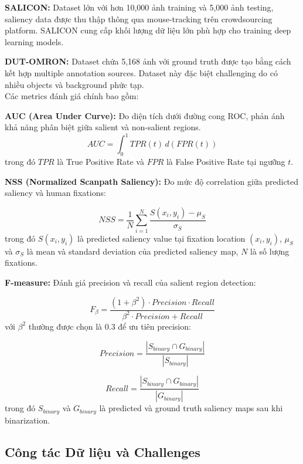 \textbf{SALICON:} Dataset lớn với hơn 10,000 ảnh training và 5,000 ảnh testing, saliency data được thu thập thông qua mouse-tracking trên crowdsourcing platform. SALICON cung cấp khối lượng dữ liệu lớn phù hợp cho training deep learning models.

\textbf{DUT-OMRON:} Dataset chứa 5,168 ảnh với ground truth được tạo bằng cách kết hợp multiple annotation sources. Dataset này đặc biệt challenging do có nhiều objects và background phức tạp. \\
Các metrics đánh giá chính bao gồm:

\textbf{AUC (Area Under Curve):} Đo diện tích dưới đường cong ROC, phản ánh khả năng phân biệt giữa salient và non-salient regions.
    \begin{equation}
        AUC = \int_{0}^{1} TPR(t) \, d(FPR(t))
    \end{equation}
trong đó $TPR$ là True Positive Rate và $FPR$ là False Positive Rate tại ngưỡng $t$.

\textbf{NSS (Normalized Scanpath Saliency):} Đo mức độ correlation giữa predicted saliency và human fixations:

\begin{equation}
NSS = \frac{1}{N} \sum_{i=1}^{N} \frac{S(x_i, y_i) - \mu_S}{\sigma_S}
\end{equation}
trong đó $S(x_i, y_i)$ là predicted saliency value tại fixation location $(x_i, y_i)$, $\mu_S$ và $\sigma_S$ là mean và standard deviation của predicted saliency map, $N$ là số lượng fixations.

\textbf{F-measure:} Đánh giá precision và recall của salient region detection:

\begin{equation}
F_\beta = \frac{(1 + \beta^2) \cdot Precision \cdot Recall}{\beta^2 \cdot Precision + Recall}
\end{equation}
với $\beta^2$ thường được chọn là 0.3 để ưu tiên precision:

\begin{equation}
Precision = \frac{|S_{binary} \cap G_{binary}|}{|S_{binary}|}
\end{equation}

\begin{equation}
Recall = \frac{|S_{binary} \cap G_{binary}|}{|G_{binary}|}
\end{equation}
trong đó $S_{binary}$ và $G_{binary}$ là predicted và ground truth saliency maps sau khi binarization.

\subsection{Công tác Dữ liệu và Challenges}

